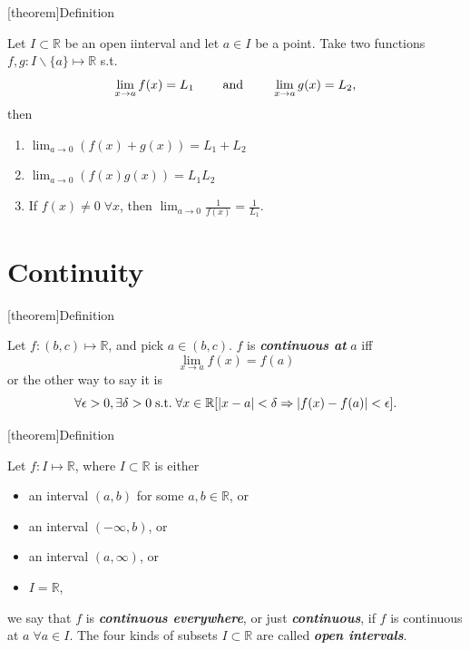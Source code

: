 \documentclass[12pt]{report}
\theoremstyle{definition}
\begin{document}
[theorem]{Definition}
\begin{Algebra of limits}
    Let $I\subset \mathbb{R}$ be an open iinterval and let $a\in I$ be a point.
    Take two functions $f,g:I\backslash\{a\}\mapsto\mathbb{R}$ s.t.\[
        \lim_{x\rightarrow{}a} f(x) = L_1 \qquad\;\textnormal{and}\;\qquad
        \lim_{x\to a} g(x) = L_2,
    \]then
    \begin{enumerate}
        \item $\lim_{a\to 0}(f(x)+g(x)) = L_1 + L_2$
        \item $\lim_{a\rightarrow{}0}(f(x)g(x)) = L_1L_2$
        \item If $f(x)\neq 0 \;\forall x$, then $\lim_{a\to{}0}\frac{1}{f(x)}=\frac{1}{L_1}$.
    \end{enumerate}
\end{Algebra of limits}

\section{Continuity}

[theorem]{Definition}
\begin{continuous at a}
    Let $f:(b,c)\mapsto\mathbb{R}$, and pick $a\in(b,c)$.
    $f$ is \textbf{\emph{continuous at}} $a$ iff\[
        \lim_{x\rightarrow{}a}f(x) = f(a)
    \]or the other way to say it is\[
        \forall \epsilon>0, \exists \delta>0 \;\textnormal{s.t.}\;
        \forall x\in\mathbb{R}[|x-a|<\delta \Rightarrow{}|f(x) - f(a)|<\epsilon].
    \]
\end{continuous at a}

[theorem]{Definition}
\begin{continuous function}
    Let $f:I\mapsto\mathbb{R}$, where $I\subset\mathbb{R}$ is either
    \begin{itemize}
        \item an interval $(a,b)$ for some $a,b\in\mathbb{R}$, or
        \item an interval $(-\infty, b)$, or
        \item an interval $(a, \infty)$, or
        \item $I = \mathbb{R}$,
    \end{itemize}
    we say that $f$ is \textbf{\emph{continuous everywhere}}, or just \textbf{\emph{continuous}},
    if $f$ is continuous at $a \;\forall a\in I$.
    The four kinds of subsets $I\subset\mathbb{R}$ are called \textbf{\emph{open intervals}}.
\end{continuous function}
\end{document}
